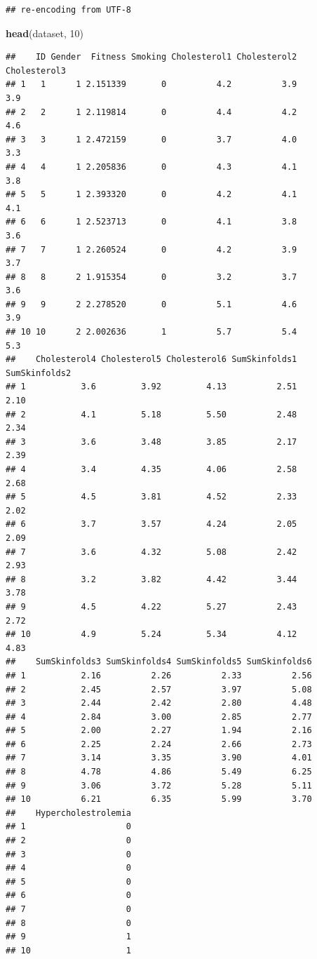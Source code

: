 \documentclass[]{book}
\newenvironment{Shaded}{\begin{snugshade}}{\end{snugshade}}
\newcommand{\KeywordTok}[1]{\textcolor[rgb]{0.13,0.29,0.53}{\textbf{#1}}}
\newcommand{\DecValTok}[1]{\textcolor[rgb]{0.00,0.00,0.81}{#1}}
\newcommand{\NormalTok}[1]{#1}
\begin{document}
\begin{verbatim}
## re-encoding from UTF-8
\end{verbatim}

\begin{Shaded}
\begin{Highlighting}[]
\KeywordTok{head}\NormalTok{(dataset, }\DecValTok{10}\NormalTok{)}
\end{Highlighting}
\end{Shaded}

\begin{verbatim}
##    ID Gender  Fitness Smoking Cholesterol1 Cholesterol2 Cholesterol3
## 1   1      1 2.151339       0          4.2          3.9          3.9
## 2   2      1 2.119814       0          4.4          4.2          4.6
## 3   3      1 2.472159       0          3.7          4.0          3.3
## 4   4      1 2.205836       0          4.3          4.1          3.8
## 5   5      1 2.393320       0          4.2          4.1          4.1
## 6   6      1 2.523713       0          4.1          3.8          3.6
## 7   7      1 2.260524       0          4.2          3.9          3.7
## 8   8      2 1.915354       0          3.2          3.7          3.6
## 9   9      2 2.278520       0          5.1          4.6          3.9
## 10 10      2 2.002636       1          5.7          5.4          5.3
##    Cholesterol4 Cholesterol5 Cholesterol6 SumSkinfolds1 SumSkinfolds2
## 1           3.6         3.92         4.13          2.51          2.10
## 2           4.1         5.18         5.50          2.48          2.34
## 3           3.6         3.48         3.85          2.17          2.39
## 4           3.4         4.35         4.06          2.58          2.68
## 5           4.5         3.81         4.52          2.33          2.02
## 6           3.7         3.57         4.24          2.05          2.09
## 7           3.6         4.32         5.08          2.42          2.93
## 8           3.2         3.82         4.42          3.44          3.78
## 9           4.5         4.22         5.27          2.43          2.72
## 10          4.9         5.24         5.34          4.12          4.83
##    SumSkinfolds3 SumSkinfolds4 SumSkinfolds5 SumSkinfolds6
## 1           2.16          2.26          2.33          2.56
## 2           2.45          2.57          3.97          5.08
## 3           2.44          2.42          2.80          4.48
## 4           2.84          3.00          2.85          2.77
## 5           2.00          2.27          1.94          2.16
## 6           2.25          2.24          2.66          2.73
## 7           3.14          3.35          3.90          4.01
## 8           4.78          4.86          5.49          6.25
## 9           3.06          3.72          5.28          5.11
## 10          6.21          6.35          5.99          3.70
##    Hypercholestrolemia
## 1                    0
## 2                    0
## 3                    0
## 4                    0
## 5                    0
## 6                    0
## 7                    0
## 8                    0
## 9                    1
## 10                   1
\end{verbatim}
\end{document}
